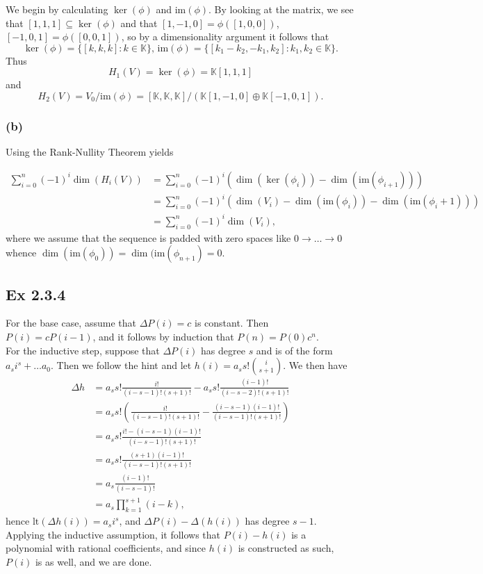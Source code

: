 \documentclass{article}
\theoremstyle{definition}
\newcommand{\K}{\mathbb{K}}
\newcommand{\im}{\text{im}}
\newcommand{\lt}{\text{lt}}
\begin{document}
We begin by calculating $\ker(\phi)$ and $\im(\phi)$.
By looking at the matrix, we see that $[1, 1, 1] \subseteq \ker(\phi)$
and that $[1, -1, 0] = \phi([1, 0, 0])$, $[-1, 0, 1] = \phi([0, 0, 1])$,
so by a dimensionality argument it follows that 
\[
	\ker(\phi)
	=
	\{[k, k, k] : k \in \K\},\, 
	\im(\phi)
	=
	\{[k_1 - k_2, -k_1, k_2] : k_1, k_2 \in \K\}.
\] 
Thus
\[
	H_1(V) = \ker(\phi) = \K[1, 1, 1]
\]
and
\[
	H_2(V) 
	= 
	V_0 / \im(\phi)
	=
	[\K, \K, \K] / (\K[1, -1, 0] \oplus \K[-1, 0, 1]).
\]

\subsubsection*{(b)}

Using the Rank-Nullity Theorem yields

\begin{align*}
	\sum_{i = 0}^{n}
	(-1)^{i} 
	\dim(H_i(V))
	&=
	\sum_{i = 0}^{n}
	(-1)^{i} 
	\left(
		\dim(\ker(\phi_i))
		-
		\dim(\im(\phi_{i + 1}))
	\right) \\
	&=
	\sum_{i = 0}^{n}
	(-1)^{i} 
	\left(
		\dim(V_i) 
		-
		\dim(\im(\phi_i))
		- 
		\dim(\im(\phi_i + 1))
	\right) \\
	&=
	\sum_{i = 0}^{n}
	(-1)^{i} 
	\dim(V_i),
\end{align*}
where we assume that the sequence is padded with zero spaces like $0 \to \ldots
\to 0$ whence $\dim(\im(\phi_0)) = \dim(\im(\phi_{n+1}) = 0$.

\subsection*{Ex 2.3.4}

For the base case, assume that $\Delta P(i) = c$ is constant. Then $P(i) = c
P(i - 1)$, and it follows by induction that $P(n) = P(0)c^n$. \\

For the inductive step, suppose that $\Delta P(i)$ has degree $s$ and is of the
form $a_s i^s + \ldots a_0$. Then we follow the hint and let $h(i) = a_s s!
\binom{i}{s + 1}$. We then have 
\begin{align*}
	\Delta h
	&=
	a_s s! \frac{i!}{(i - s - 1)!(s + 1)!}
	-
	a_s s! \frac{(i - 1)!}{(i - s - 2)!(s + 1)!} \\
	&=
	a_s s! \left(
		\frac{i!}{(i - s - 1)!(s + 1)!}
		-
		\frac{(i - s - 1)(i - 1)!}{(i - s - 1)!(s + 1)!}
	\right) \\
	&=
	a_s s! 
	\frac{i! - (i - s - 1)(i - 1)!}{(i - s - 1)!(s + 1)!} \\
	&=
	a_s s! 
	\frac{(s + 1)(i - 1)!}{(i - s - 1)!(s + 1)!} \\
	&=
	a_s
	\frac{(i - 1)!}{(i - s - 1)!} \\
	&=
	a_s
	\prod_{k = 1}^{s + 1} (i - k),
\end{align*}
hence $\lt (\Delta h(i)) = a_s i^{s}$, and $\Delta P(i) - \Delta(h(i))$ has degree $s -
1$. Applying the inductive assumption, it follows that $P(i) - h(i)$ is a
polynomial with rational coefficients, and since $h(i)$ is constructed as such,
$P(i)$ is as well, and we are done.
\end{document}

